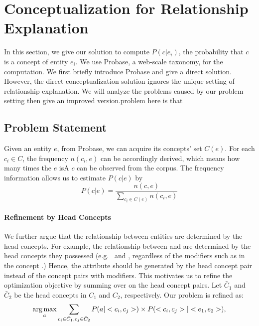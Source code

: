 \section{Conceptualization for Relationship Explanation}
\label{sec:conceptualization}
In this section, we give our solution to compute $P(c|e_i)$, the probability that $c$ is a concept of entity $e_i$.
We use Probase, a web-scale taxonomy, for the computation. We first briefly introduce Probase and give a direct solution. However, the direct conceptualization solution ignores the unique setting of relationship explanation. We will analyze the problems caused by our problem setting then give an improved version.problem here is that 

\subsection{Problem Statement}


Given an entity $e$, from Probase, we can acquire its concepts' set $C(e)$. For each $c_i \in C$, the frequency $n(c_i,e)$ can be accordingly derived, which means how many times the $e$ isA $c$ can be observed from the corpus. The frequency information allows us to estimate  $P(c|e)$ by 
$$P(c|e)=\frac{n(c,e)}{\sum_{c_i\in C(e)}n(c_i, e)}$$


\paragraph{Refinement by Head Concepts}
We further argue that the relationship between entities are determined by the head concepts. For example, the  relationship between  and  are determined by the head concepts they possessed (e.g.\  and , regardless of the modifiers such as  in the concept .) Hence, the attribute should be generated by the head concept pair instead of the concept pairs with modifiers. This motivates us to refine the optimization objective by summing over on the head concept pairs. Let $\bar{C}_1$ and $\bar{C}_2$ be the head concepts in  $C_1$ and $C_2$, respectively. Our problem is refined as:
\begin{equation}
\label{eq:target}
\operatorname*{arg\,max}_a \sum_{c_i\in \bar{C}_1 , c_j \in \bar{C}_2 }P(a|<c_{i},c_{j}>)\times P(<c_{i},c_{j}>|<e_{1},e_{2}>),
\end{equation}

